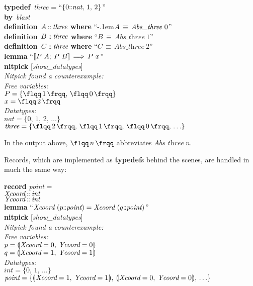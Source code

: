 \documentclass[a4paper,12pt]{article}
\def\Colon{\mathord{:\mkern-1.5mu:}}
\def\lparr{\mathopen{(\mkern-4mu\mid}}
\def\rparr{\mathclose{\mid\mkern-4mu)}}
\def\unr{\ldots}
\def\Abs#1{\hbox{\rm{\flqq}}{\,#1\,}\hbox{\rm{\frqq}}}
\begin{document}
\prew
\textbf{typedef}~\textit{three} = ``$\{0\Colon\textit{nat},\, 1,\, 2\}$'' \\
\textbf{by}~\textit{blast} \\[2\smallskipamount]
\textbf{definition}~$A \mathbin{\Colon} \textit{three}$ \textbf{where} ``\kern-.1em$A \,\equiv\, \textit{Abs\_\allowbreak three}~0$'' \\
\textbf{definition}~$B \mathbin{\Colon} \textit{three}$ \textbf{where} ``$B \,\equiv\, \textit{Abs\_three}~1$'' \\
\textbf{definition}~$C \mathbin{\Colon} \textit{three}$ \textbf{where} ``$C \,\equiv\, \textit{Abs\_three}~2$'' \\[2\smallskipamount]
\textbf{lemma} ``$\mathopen{[\![} P~A;\> P~B\mathclose{]\!]} \,\Longrightarrow\, P~x$'' \\
\textbf{nitpick} [\textit{show\_datatypes}] \\[2\smallskipamount]
\slshape Nitpick found a counterexample: \\[2\smallskipamount]
\hbox{}\qquad Free variables: \nopagebreak \\
\hbox{}\qquad\qquad $P = \{\Abs{1},\, \Abs{0}\}$ \\
\hbox{}\qquad\qquad $x = \Abs{2}$ \\
\hbox{}\qquad Datatypes: \\
\hbox{}\qquad\qquad $\textit{nat} = \{0,\, 1,\, 2,\, \unr\}$ \\
\hbox{}\qquad\qquad $\textit{three} = \{\Abs{2},\, \Abs{1},\, \Abs{0},\, \unr\}$
\postw

In the output above, $\Abs{n}$ abbreviates $\textit{Abs\_three}~n$.

Records, which are implemented as \textbf{typedef}s behind the scenes, are
handled in much the same way:

\prew
\textbf{record} \textit{point} = \\
\hbox{}\quad $\textit{Xcoord} \mathbin{\Colon} \textit{int}$ \\
\hbox{}\quad $\textit{Ycoord} \mathbin{\Colon} \textit{int}$ \\[2\smallskipamount]
\textbf{lemma} ``$\textit{Xcoord}~(p\Colon\textit{point}) = \textit{Xcoord}~(q\Colon\textit{point})$'' \\
\textbf{nitpick} [\textit{show\_datatypes}] \\[2\smallskipamount]
\slshape Nitpick found a counterexample: \\[2\smallskipamount]
\hbox{}\qquad Free variables: \nopagebreak \\
\hbox{}\qquad\qquad $p = \lparr\textit{Xcoord} = 0,\> \textit{Ycoord} = 0\rparr$ \\
\hbox{}\qquad\qquad $q = \lparr\textit{Xcoord} = 1,\> \textit{Ycoord} = 1\rparr$ \\
\hbox{}\qquad Datatypes: \\
\hbox{}\qquad\qquad $\textit{int} = \{0,\, 1,\, \unr\}$ \\
\hbox{}\qquad\qquad $\textit{point} = \{\lparr\textit{Xcoord} = 1,\>
\textit{Ycoord} = 1\rparr,\> \lparr\textit{Xcoord} = 0,\> \textit{Ycoord} = 0\rparr,\, \unr\}$\kern-1pt %
\postw
\end{document}
